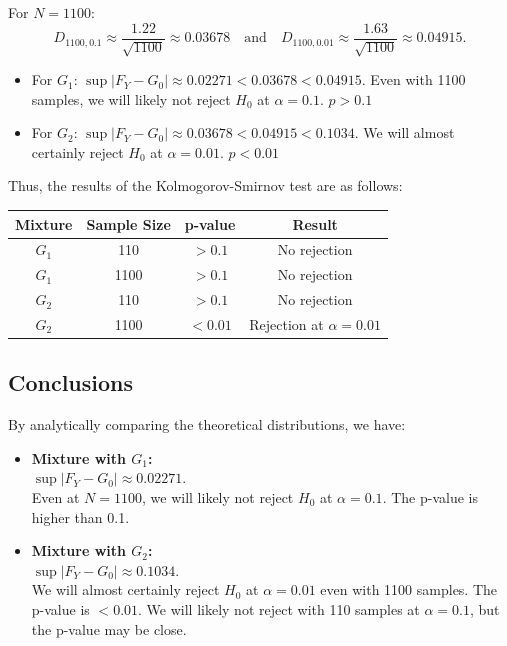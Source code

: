 \documentclass{article}
\begin{document}
For \(N=1100\):
\[
D_{1100,0.1} \approx \frac{1.22}{\sqrt{1100}} \approx 0.03678 \quad \text{and} \quad D_{1100,0.01} \approx \frac{1.63}{\sqrt{1100}} \approx 0.04915.
\]

\begin{itemize}
    \item For \(G_1\): \(\sup|F_Y-G_0|\approx 0.02271 < 0.03678 < 0.04915\). Even with 1100 samples, we will likely not reject \(H_0\) at \(\alpha=0.1\). \(p > 0.1\)
    \item For \(G_2\): \(\sup|F_Y-G_0|\approx 0.03678 < 0.04915 < 0.1034\). We will almost certainly reject \(H_0\) at \(\alpha=0.01\). \(p < 0.01\)
\end{itemize}

Thus, the results of the Kolmogorov-Smirnov test are as follows:

\begin{table}[h]
\centering
\begin{tabular}{|c|c|c|c|}
\hline
\textbf{Mixture} & \textbf{Sample Size} & \textbf{p-value} & \textbf{Result} \\ \hline
\(G_1\) & 110 & \(>0.1\) & No rejection \\ \hline
\(G_1\) & 1100 & \(>0.1\) & No rejection \\ \hline
\(G_2\) & 110 & \(>0.1\) & No rejection \\ \hline
\(G_2\) & 1100 & \(<0.01\) & Rejection at \(\alpha=0.01\) \\ \hline
\end{tabular}
\end{table}

\subsection{Conclusions}

By analytically comparing the theoretical distributions, we have:

\begin{itemize}
    \item \textbf{Mixture with \(G_1\):}\\
    \(\sup|F_Y-G_0|\approx 0.02271\).\\  
    Even at \(N=1100\), we will likely not reject \(H_0\) at \(\alpha=0.1\). The p-value is higher than 0.1.
    \item \textbf{Mixture with \(G_2\):}\\
    \(\sup|F_Y-G_0|\approx 0.1034\).\\
    We will almost certainly reject \(H_0\) at \(\alpha=0.01\) even with 1100 samples. The p-value is \(<0.01\). We will likely not reject with 110 samples at \(\alpha=0.1\), but the p-value may be close.
\end{itemize}
\end{document}
